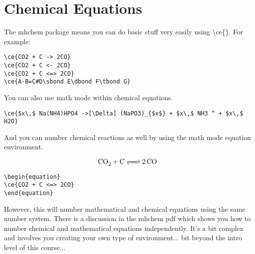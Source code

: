 \chapter{Chemical Equations}
The mhchem package means you can do basic stuff very easily using {\textbackslash}ce\{\}. For example:

\vspace{2ex}
\begin{verbatim}
\ce{CO2 + C -> 2CO}
\ce{CO2 + C <- 2CO}
\ce{CO2 + C <=> 2CO}
\ce{A-B=C#D\sbond E\dbond F\tbond G}
\end{verbatim}
\vspace{2ex}
\begin{center}



\end{center}

\vspace{2ex}
You can also use math mode within chemical equations.
\vspace{2ex}

\begin{center}
\end{center}

\begin{verbatim}
\ce{$x\,$ Na(NH4)HPO4 ->[\Delta] (NaPO3)_{$x$} + $x\,$ NH3 ^ + $x\,$ H2O}
\end{verbatim}

And you can number chemical reactions as well by using the math mode equation environment.

\begin{equation}
\ce{CO2 + C <=> 2CO}
\end{equation}

\begin{verbatim}
\begin{equation}
\ce{CO2 + C <=> 2CO}
\end{equation}
\end{verbatim}

However, this will number mathematical and chemical equations using the same number system. There is a discussion in the mhchem pdf which shows you how to number chemical and mathematical equations independently. It's a bit complex and involves you creating your own type of environment... bit beyond the intro level of this course... 